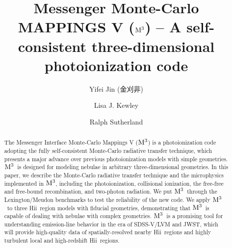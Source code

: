\documentclass[twocolumn]{aastex62}
\newcommand{\newcode}{{$\rm M^3$}}
\newcommand{\hiireg}{{H{\sc ii}}}
\begin{document}
\begin{CJK*}{UTF8}{gbsn}

\title{Messenger Monte-Carlo MAPPINGS V (\newcode ) -- A self-consistent three-dimensional photoionization code}


\author[0000-0003-0401-3688]{Yifei Jin (金刈非)}


\author[0000-0001-8152-3943]{Lisa J. Kewley}

\author[0000-0002-6620-7421]{Ralph Sutherland}

\begin{abstract}

The Messenger Interface Monte-Carlo Mappings V (\newcode) is a photoionization code adopting the fully self-consistent Monte-Carlo radiative transfer technique, which presents a major advance over previous photoionization models with simple geometries.
\newcode\ is designed for modeling nebulae in arbitrary three-dimensional geometries.
In this paper, we describe the Monte-Carlo radiative transfer technique and the microphysics implemented in \newcode , including the photoionization, collisional ionization, the free-free and free-bound recombination, and two-photon radiation.
We put \newcode\ through the Lexington/Meudon benchmarks to test the reliability of the new code.
We apply \newcode\ to three \hiireg\ region models with fiducial geometries, demonstrating that \newcode\ is capable of dealing with nebulae with complex geometries.
\newcode\ is a promising tool for understanding emission-line behavior in the era of SDSS-V/LVM and JWST, which will provide high-quality data of spatially-resolved nearby \hiireg\ regions and highly turbulent local and high-redshift \hiireg\ regions.

\end{abstract}





\end{CJK*}
\end{document}
